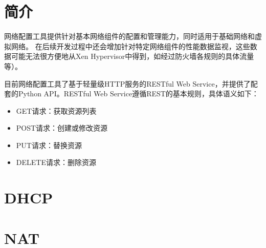 \section{简介}
网络配置工具提供针对基本网络组件的配置和管理能力，同时适用于基础网络和虚拟网络。
在后续开发过程中还会增加针对特定网络组件的性能数据监视，这些数据可能无法很方便地从Xen Hypervisor中得到，如经过防火墙各规则的具体流量等）。

目前网络配置工具了基于轻量级HTTP服务的RESTful Web Service，并提供了配套的Python API。RESTful Web Service遵循REST的基本规则\cite{fielding2000architectural}，具体语义如下：

\begin{itemize}
\item GET请求：获取资源列表
\item POST请求：创建或修改资源
\item PUT请求：替换资源
\item DELETE请求：删除资源
\end{itemize}

\section{DHCP}

\section{NAT}

